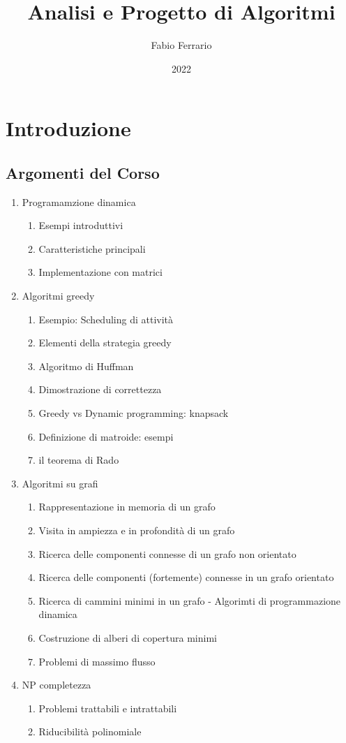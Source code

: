 \documentclass[12pt, a4paper, openany]{book}
\begin{document}
\title{Analisi e Progetto di Algoritmi}
\author{Fabio Ferrario}
\date{2022}
\maketitle

\tableofcontents

\chapter*{Introduzione}
\section*{Argomenti del Corso}
\begin{enumerate}
	\item Programamzione dinamica
	      \begin{enumerate}
		      \item Esempi introduttivi
		      \item Caratteristiche principali
		      \item Implementazione con matrici
	      \end{enumerate}
	\item Algoritmi greedy
	      \begin{enumerate}
		      \item Esempio: Scheduling di attività
		      \item Elementi della strategia greedy
		      \item Algoritmo di Huffman
		      \item Dimostrazione di correttezza
		      \item Greedy vs Dynamic programming: knapsack
		      \item Definizione di matroide: esempi
		      \item il teorema di Rado
	      \end{enumerate}
	\item Algoritmi su grafi
	      \begin{enumerate}
		      \item Rappresentazione in memoria di un grafo
		      \item Visita in ampiezza e in profondità di un grafo
		      \item Ricerca delle componenti connesse di un grafo non orientato
		      \item Ricerca delle componenti (fortemente) connesse in un grafo orientato
		      \item Ricerca di cammini minimi in un grafo - Algorimti di programmazione dinamica
		      \item Costruzione di alberi di copertura minimi
		      \item Problemi di massimo flusso
	      \end{enumerate}
	\item NP completezza
	      \begin{enumerate}
		      \item Problemi trattabili e intrattabili
		      \item Riducibilità polinomiale
	      \end{enumerate}


\end{enumerate}
\end{document}
